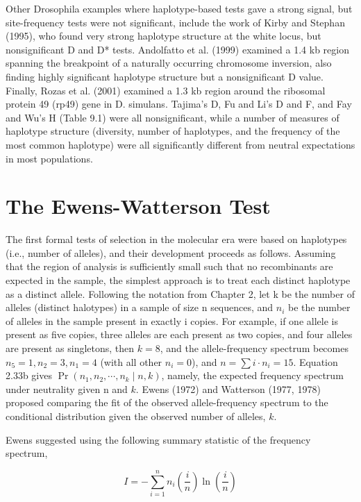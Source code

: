 \documentclass{article}
\begin{document}
Other Drosophila examples where haplotype-based tests gave a strong signal, but site-frequency tests were not significant, include the work of Kirby and Stephan (1995), who found very strong haplotype structure at the white locus, but nonsignificant D and D* tests. Andolfatto et al. (1999) examined a 1.4 kb region spanning the breakpoint of a naturally occurring chromosome inversion, also finding highly significant haplotype structure but a nonsignificant D value. Finally, Rozas et al. (2001) examined a 1.3 kb region around the ribosomal protein 49 (rp49) gene in D. simulans. Tajima's D, Fu and Li's D and F, and Fay and Wu's H (Table 9.1) were all nonsignificant, while a number of measures of haplotype structure (diversity, number of haplotypes, and the frequency of the most common haplotype) were all significantly different from neutral expectations in most populations.

\section{The Ewens-Watterson Test}
The first formal tests of selection in the molecular era were based on haplotypes (i.e., number of alleles), and their development proceeds as follows. Assuming that the region of analysis is sufficiently small such that no recombinants are expected in the sample, the simplest approach is to treat each distinct haplotype as a distinct allele. Following the notation from Chapter 2, let k be the number of alleles (distinct halotypes) in a sample of size n sequences, and  $ n_i $ be the number of alleles in the sample present in exactly i copies. For example, if one allele is present as five copies, three alleles are each present as two copies, and four alleles are present as singletons, then  $ k = 8 $, and the allele-frequency spectrum becomes  $ n_5 = 1, n_2 = 3, n_1 = 4 $ (with all other  $ n_i = 0 $), and  $ n = \sum i \cdot n_i = 15 $. Equation 2.33b gives  $ \Pr(n_1, n_2, \cdots, n_k \mid n, k) $, namely, the expected frequency spectrum under neutrality given n and  $ k $. Ewens (1972) and Watterson (1977, 1978) proposed comparing the fit of the observed allele-frequency spectrum to the conditional distribution given the observed number of alleles,  $ k $.

Ewens suggested using the following summary statistic of the frequency spectrum,

\begin{equation}
I=-\sum_{i=1}^{n}n_{i}\left(\frac{i}{n}\right)\ln\left(\frac{i}{n}\right)
\tag{9.30a}
\label{eq:9_30a}
\end{equation}
\end{document}
